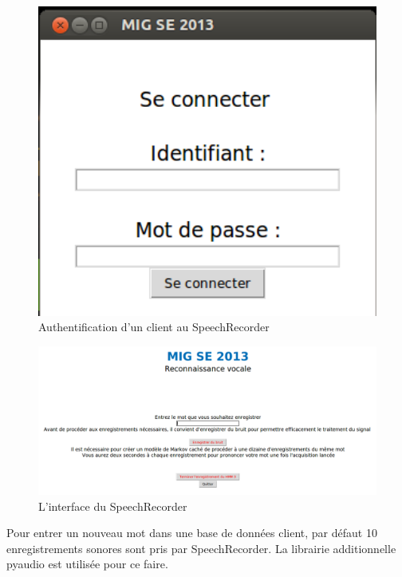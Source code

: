 \documentclass[a4paper,12pt]{report}
\begin{document}
\begin{figure}[H]
	\begin{center}
	\includegraphics[width=14cm]{pics/speechrecorder-log.png} 
	\end{center}
	\caption{Authentification d'un client au SpeechRecorder}
\end{figure}

\begin{figure}[H]
	\begin{center}
	\includegraphics[width=14cm]{pics/speechrecorder-record.png} 
	\end{center}
	\caption{L'interface du SpeechRecorder}
\end{figure}

Pour entrer un nouveau mot dans une base de données client, par défaut 10 enregistrements sonores sont pris par SpeechRecorder. La librairie additionnelle pyaudio est utilisée pour ce faire.
\end{document}
